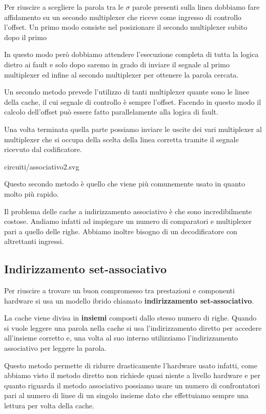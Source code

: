 Per riuscire a scegliere la parola tra le $\sigma$ parole presenti sulla linea dobbiamo fare
affidamento su un secondo multiplexer che riceve come ingresso di controllo l'offset. Un primo modo
consiste nel posizionare il secondo multiplexer subito dopo il primo
\begin{center}
	
\end{center}
In questo modo però dobbiamo attendere l'esecuzione completa di tutta la logica dietro ai fault e
solo dopo saremo in grado di inviare il segnale al primo multiplexer ed infine al secondo
multiplexer per ottenere la parola cercata.

Un secondo metodo prevede l'utilizzo di tanti multiplexer quante sono le linee della cache, il cui
segnale di controllo è sempre l'offset. Facendo in questo modo il calcolo dell'offset può essere
fatto parallelamente alla logica di fault.

Una volta terminata quella parte possiamo inviare le uscite dei vari multiplexer al multiplexer che
si occupa della scelta della linea corretta tramite il segnale ricevuto dal codificatore.
\begin{center}
	 {circuiti/associativo2.svg}
\end{center}
Questo secondo metodo è quello che viene più comunemente usato in quanto molto più rapido.

Il problema delle cache a indirizzamento associativo è che sono incredibilmente costose. Andiamo
infatti ad impiegare un numero di comparatori e multiplexer pari a quello delle righe. Abbiamo
inoltre bisogno di un decodificatore con altrettanti ingressi.

\subsection{Indirizzamento set-associativo}
Per riuscire a trovare un buon compromesso tra prestazioni e componenti hardware si usa un modello
ibrido chiamato \textbf{indirizzamento set-associativo}.

La cache viene divisa in \textbf{insiemi} composti dallo stesso numero di righe. Quando si vuole
leggere una parola nella cache si usa l'indirizzamento diretto per accedere all'insieme corretto e,
una volta al suo interno utilizziamo l'indirizzamento associativo per leggere la parola.

Questo metodo permette di ridurre drasticamente l'hardware usato infatti, come abbiamo visto il
metodo diretto non richiede quasi niente a livello hardware e per quanto riguarda il metodo
associativo possiamo usare un numero di confrontatori pari al numero di linee di un singolo insieme
dato che effettuiamo sempre una lettura per volta della cache.

